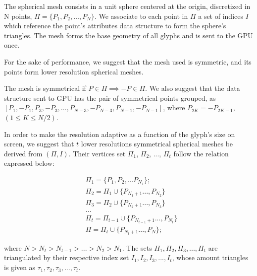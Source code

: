 \documentclass[twoside,twocolumn,10pt]{article}
\begin{document}

The spherical mesh consists in a unit sphere centered at the origin, discretized in N points, $\Pi = \{P_1, P_2, \dots, P_N\}$. We associate to each point in $\Pi$ a set of indices $I$ which reference the point's attributes data structure to form the sphere's triangles. The mesh forms the base geometry of all glyphs and is sent to the GPU once.

For the sake of performance, we suggest that the mesh used is symmetric, and its points form lower resolution spherical meshes.

The mesh is symmetrical if $P \in \Pi \implies -P \in \Pi$. We also suggest that the data structure sent to GPU has the pair of symmetrical points grouped, as $[P_1, -P_1, P_3, -P_3, \dots, P_{N-3}, -P_{N-3}, P_{N-1}, -P_{N-1}]$, where $P_{2K} = -P_{2K-1}$, $(1 \leq K \leq N/2)$.

In order to make the resolution adaptive as a function of the glyph's size on screen, we suggest that $t$ lower resolutions symmetrical spherical meshes be derived from $(\Pi, I)$. Their vertices set $\Pi_{1}$, $\Pi_{2}$, ..., $\Pi_{t}$ follow the relation expressed below:

\begin{align}
 \label{eq::subset_condition}
    &\Pi_{1} = \{P_1, P_2,... P_{N_1}\}; \nonumber\\
    &\Pi_{2} = \Pi_1 \cup \{ P_{N_1+1}..., P_{N_2}\} \nonumber\\
    &\Pi_{3} = \Pi_2 \cup \{ P_{N_2+1}..., P_{N_3}\} \nonumber\\
    &... \\
    &\Pi_{t} = \Pi_{t-1} \cup \{ P_{N_{t-1}+1}..., P_{N_t}\} \nonumber\\
    &\Pi = \Pi_{t} \cup \{ P_{N_t+1}..., P_{N}\}; \nonumber
\end{align}

where $N > N_t > N_{t-1} > ... > N_2 > N_1$. The sets $\Pi_{1}, \Pi_{2}, \Pi_{3}, ..., \Pi_{t}$ are triangulated by their respective index set $I_{1}, I_{2}, I_{3}, ..., I_{t}$, whose amount triangles is given as $\tau_1, \tau_2, \tau_3, ..., \tau_t$. %
\end{document}
